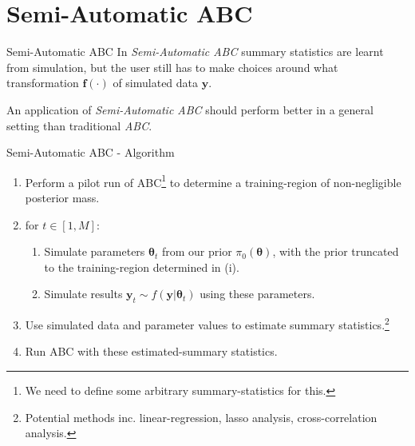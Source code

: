 \documentclass[11pt,a4paper]{article}
\begin{document}
\section{Semi-Automatic ABC}

  \begin{definition}{Semi-Automatic ABC\cite{Constructing_Summary_Statistics_For_ABC}}
    In \textit{Semi-Automatic ABC} summary statistics are learnt from simulation, but the user still has to make choices around what transformation $\mathbf{f}(\cdot)$ of simulated data $\mathbf{y}$.
    \par An application of \textit{Semi-Automatic ABC} should perform better in a general setting than traditional \textit{ABC}.
  \end{definition}

  \begin{proposition}{Semi-Automatic ABC - Algorithm}
    \begin{enumerate}
      \item Perform a pilot run of ABC\footnote{We need to define some arbitrary summary-statistics for this.} to determine a training-region of non-negligible posterior mass.
      \item for $t\in[1,M]$:
      \begin{enumerate}
        \item Simulate parameters $\pmb\theta_t$ from our prior $\pi_0(\pmb\theta)$, with the prior truncated to the training-region determined in (i).
        \item Simulate results $\mathbf{y}_t\sim f(\mathbf{y}|\pmb\theta_t)$ using these parameters.
      \end{enumerate}
      \item Use simulated data and parameter values to estimate summary statistics.\footnote{Potential methods inc. linear-regression, lasso analysis, cross-correlation analysis.}
      \item Run ABC with these estimated-summary statistics.
    \end{enumerate}
  \end{proposition}
\end{document}
